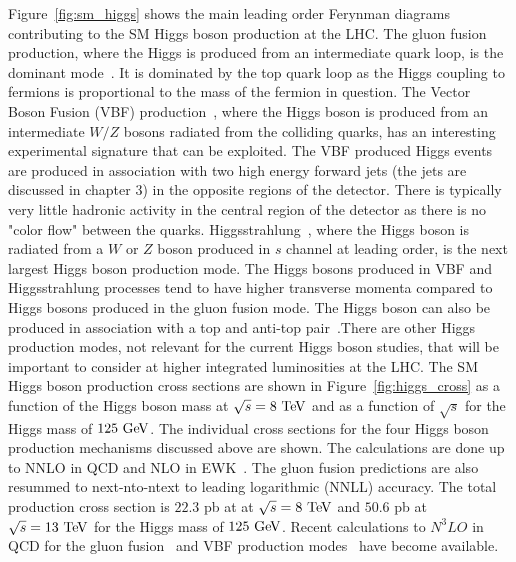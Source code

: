 Figure~\ref{fig:sm_higgs} shows the main leading order Ferynman diagrams contributing to the SM Higgs boson production at the LHC. The gluon fusion production, where the Higgs is produced from an intermediate quark loop, is the dominant mode~\cite{Georgi:1977gs}. It is dominated by the top quark loop as the Higgs coupling to fermions is proportional to the mass of the fermion in question. The Vector Boson Fusion (VBF) production~\cite{Cahn:1983ip}, where the Higgs boson is produced from an intermediate $W/Z$ bosons radiated from the colliding quarks, has an interesting experimental signature that can be exploited.  The VBF produced Higgs events are produced in association with two high energy forward jets (the jets are discussed in chapter $3$) in the opposite regions of the detector.  There is typically very little hadronic activity in the central region of the detector as there is no "color flow" between the quarks. Higgsstrahlung~\cite{Glashow:1978ab}, where the Higgs boson is radiated from a $W$ or $Z$ boson produced in $s$ channel at leading order, is the next largest Higgs boson production mode.  The Higgs bosons produced in VBF and Higgsstrahlung processes tend to have higher transverse momenta compared to Higgs bosons produced in the gluon fusion mode. The Higgs boson can also be produced in association with a top and anti-top pair~\cite{Raitio:1978pt,Ng:1983jm,Kunszt:1984ri,Marciano:1991qq}.There are other Higgs production modes, not relevant for the current Higgs boson studies, that will be important to consider at higher integrated luminosities at the LHC. The SM Higgs boson production cross sections are shown in Figure~\ref{fig:higgs_cross} as a function of the Higgs boson mass at $\sqrt{s}=8~\mathrm{Te\kern -0.1em V}$ and as a function of $\sqrt{s}$ for the Higgs mass of $125~\mathrm{Ge\kern -0.1em V}$. The individual cross sections for the four Higgs boson production mechanisms discussed above are shown. The calculations are done up to NNLO in QCD and NLO in EWK~\cite{Dittmaier:2011ti,Dittmaier:2012vm,Heinemeyer:2013tqa}. The gluon fusion predictions are also resummed to next-nto-ntext to leading logarithmic (NNLL) accuracy. The total production cross section is $22.3$ pb at   at $\sqrt{s}=8~\mathrm{Te\kern -0.1em V}$ and $50.6$ pb at $\sqrt{s}=13~\mathrm{Te\kern -0.1em V}$ for the Higgs mass of $125~\mathrm{Ge\kern -0.1em V}$.  Recent calculations to $N^{3}LO$ in QCD for the gluon fusion~\cite{Anastasiou:2016cez} and VBF production modes~\cite{Dreyer:2016oyx} have become available. 

